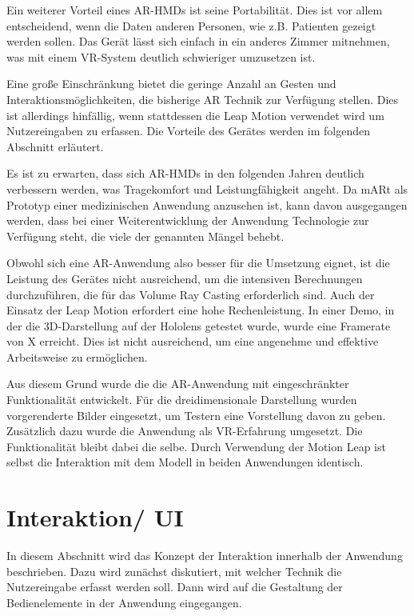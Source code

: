 Ein weiterer Vorteil eines AR-HMDs ist seine Portabilität. Dies ist vor allem entscheidend, wenn die Daten anderen Personen, wie z.B. Patienten gezeigt werden sollen. Das Gerät lässt sich einfach in ein anderes Zimmer mitnehmen, was mit einem VR-System deutlich schwieriger umzusetzen ist.
 
Eine große Einschränkung bietet die geringe Anzahl an Gesten und Interaktionsmöglichkeiten, die bisherige AR Technik zur Verfügung stellen. Dies ist allerdings hinfällig, wenn stattdessen die Leap Motion verwendet wird um Nutzereingaben zu erfassen. Die Vorteile des Gerätes werden im folgenden Abschnitt erläutert.

Es ist zu erwarten, dass sich AR-HMDs in den folgenden Jahren deutlich verbessern werden, was Tragekomfort und Leistungfähigkeit angeht. Da mARt als Prototyp einer medizinischen Anwendung anzusehen ist, kann davon ausgegangen werden, dass bei einer Weiterentwicklung der Anwendung Technologie zur Verfügung steht, die viele der genannten Mängel behebt.

Obwohl sich eine AR-Anwendung also besser für die Umsetzung eignet, ist die Leistung des Gerätes nicht ausreichend, um die intensiven Berechnungen durchzuführen, die für das Volume Ray Casting erforderlich sind. Auch der Einsatz der Leap Motion erfordert eine hohe Rechenleistung.
In einer Demo, in der die 3D-Darstellung auf der Hololens getestet wurde, wurde eine Framerate von X erreicht. 
Dies ist nicht ausreichend, um eine angenehme und effektive Arbeitsweise zu ermöglichen. 

Aus diesem Grund wurde die die AR-Anwendung mit eingeschränkter Funktionalität entwickelt. Für die dreidimensionale Darstellung wurden vorgerenderte Bilder eingesetzt, um Testern eine Vorstellung davon zu geben.
Zusätzlich dazu wurde die Anwendung als VR-Erfahrung umgesetzt. Die Funktionalität bleibt dabei die selbe. 
Durch Verwendung der Motion Leap ist selbst die Interaktion mit dem Modell in beiden Anwendungen identisch. 



\section{Interaktion/ UI } 

In diesem Abschnitt wird das Konzept der Interaktion innerhalb der Anwendung beschrieben. Dazu wird zunächst diskutiert, mit welcher Technik die Nutzereingabe erfasst werden soll. Dann wird auf die Gestaltung der Bedienelemente in der Anwendung eingegangen.

